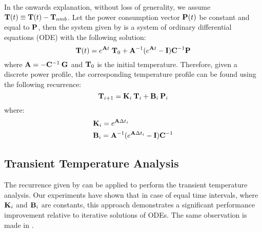 In the onwards explanation, without loss of generality, we assume $\mathbf{T}(t) \equiv \mathbf{T}(t) - \mathbf{T}_{amb}$. Let the power consumption vector $\mathbf{P}(t)$ be constant and equal to $\mathbf{P}$, then the system given by  is a system of ordinary differential equations (ODE) with the following solution:
\begin{equation} \label{eq:solution}
  \mathbf{T}(t) = e^{\mathbf{A} t} \; \mathbf{T}_0 + \mathbf{A}^{-1}(e^{\mathbf{A} t} - \mathbf{I})\mathbf{C}^{-1} \mathbf{P}
\end{equation}
where $\mathbf{A} = -\mathbf{C}^{-1} \: \mathbf{G}$ and $\mathbf{T}_0$ is the initial temperature. Therefore, given a discrete power profile, the corresponding temperature profile can be found using the following recurrence:
\begin{equation} \label{eq:recurrent-system}
  \mathbf{T}_{i+1} = \mathbf{K}_i \: \mathbf{T}_i + \mathbf{B}_i \: \mathbf{P}_i
\end{equation}
where:
\begin{align*}
  & \mathbf{K}_i = e^{\mathbf{A} \Delta t_i} \\
  & \mathbf{B}_i = \mathbf{A}^{-1}(e^{\mathbf{A} \Delta t_i} - \mathbf{I})\mathbf{C}^{-1}
\end{align*}

\subsection{Transient Temperature Analysis}
The recurrence given by  can be applied to perform the transient temperature analysis. Our experiments have shown that in case of equal time intervals, where $\mathbf{K}_i$ and $\mathbf{B}_i$ are constants, this approach demonstrates a significant performance improvement relative to iterative solutions of ODEs. The same observation is made in \cite{thiele2011}.


